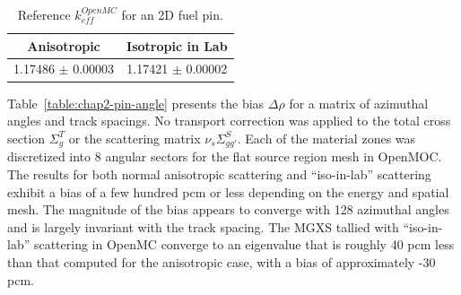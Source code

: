 \begin{table}[h!]
  \centering
  \caption{Reference $k^{OpenMC}_{eff}$ for an 2D fuel pin.}
  \label{table:chap2-pin-reference} 
  \vspace{14pt}
  \begin{tabular}{c c}
  \toprule
  \multicolumn{1}{c}{\bf Anisotropic} &
  \multicolumn{1}{c}{\bf Isotropic in Lab} \\
  \midrule
  1.17486 $\pm$ 0.00003 & 1.17421 $\pm$ 0.00002 \\
  \bottomrule
\end{tabular}
\end{table}

Table~\ref{table:chap2-pin-angle} presents the bias $\Delta\rho$ for a matrix of azimuthal angles and track spacings. No transport correction was applied to the total cross section $\Sigma^T_g$ or the scattering matrix $\nu_s\Sigma^S_{gg'}$. Each of the material zones was discretized into 8 angular sectors for the flat source region mesh in OpenMOC. The results for both normal anisotropic scattering and ``iso-in-lab'' scattering exhibit a bias of a few hundred pcm or less depending on the energy and spatial mesh. The magnitude of the bias appears to converge with 128 azimuthal angles and is largely invariant with the track spacing. The \ac{MGXS} tallied with ``iso-in-lab'' scattering in OpenMC converge to an eigenvalue that is roughly 40 pcm less than that computed for the anisotropic case, with a bias of approximately -30 pcm.

